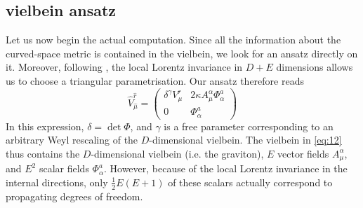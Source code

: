 \documentclass{article}
\begin{document}
\subsection{vielbein ansatz}
Let us now begin the actual computation. Since all the information about the curved-space metric is contained in the vielbein, we look for an ansatz directly on it. Moreover, following \cite{scherk1979get}, the local Lorentz invariance in $D+E$ dimensions allows us to choose a triangular parametrisation. Our ansatz therefore reads
\begin{equation} \label{eq:12}
   \boxed{ \hat V^{\hat r}_{\hat \mu} = \begin{pmatrix} 
        \delta^{\gamma} V^r _\mu &  2 \kappa A^{\alpha }_\mu \Phi^a_\alpha \\ 0 & \Phi^a_\alpha
    \end{pmatrix}}
\end{equation}
In this expression, $\delta = \det\Phi$, and $\gamma$ is a free parameter corresponding to an arbitrary Weyl rescaling of the $D$-dimensional vielbein. The vielbein in \eqref{eq:12} thus contains the $D$-dimensional vielbein (i.e. the graviton), $E$ vector fields $A^\alpha_\mu$, and $E^2$ scalar fields $\Phi^a_\alpha$. However, because of the local Lorentz invariance in the internal directions, only $\frac{1}{2}E(E+1)$ of these scalars actually correspond to propagating degrees of freedom.
\end{document}
